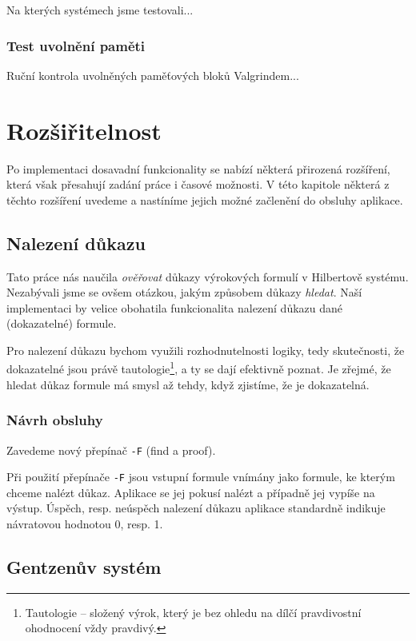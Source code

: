 \documentclass[thesis=B,czech,hidelinks]{thesis}[2012/06/26]
\begin{document}
Na kterých systémech jsme testovali...

\subsection{Test uvolnění paměti}

Ruční kontrola uvolněných paměťových bloků Valgrindem...

%
%
%

\chapter{Rozšiřitelnost}

Po implementaci dosavadní funkcionality se nabízí některá přirozená rozšíření, která však přesahují zadání práce i časové možnosti. V této kapitole některá z těchto rozšíření uvedeme a nastíníme jejich možné začlenění do obsluhy aplikace.

\section{Nalezení důkazu}

Tato práce nás naučila \emph{ověřovat} důkazy výrokových formulí v Hilbertově systému. Nezabývali jsme se ovšem otázkou, jakým způsobem důkazy \emph{hledat}. Naší implementaci by velice obohatila funkcionalita nalezení důkazu dané (dokazatelné) formule.

Pro nalezení důkazu bychom využili rozhodnutelnosti logiky, tedy skutečnosti, že dokazatelné jsou právě tautologie\footnote{Tautologie -- složený výrok, který je bez ohledu na dílčí pravdivostní ohodnocení vždy pravdivý.}, a ty se dají efektivně poznat. Je zřejmé, že hledat důkaz formule má smysl až tehdy, když zjistíme, že je dokazatelná.

\subsection{Návrh obsluhy}

Zavedeme nový přepínač \texttt{-F} (find a proof).

Při použití přepínače \texttt{-F} jsou vstupní formule vnímány jako formule, ke kterým chceme nalézt důkaz. Aplikace se jej pokusí nalézt a případně jej vypíše na výstup. Úspěch, resp. neúspěch nalezení důkazu aplikace standardně indikuje návratovou hodnotou 0, resp. 1.

\section{Gentzenův systém}
\end{document}
